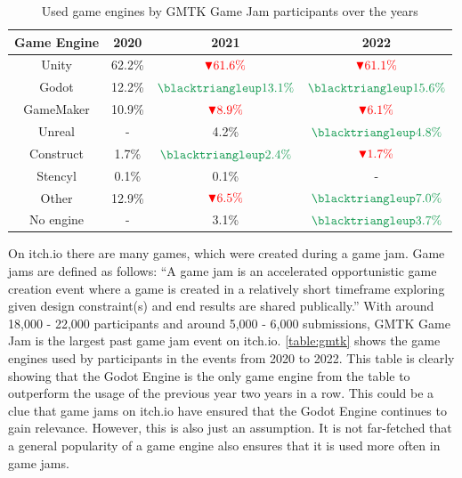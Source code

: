 \begin{table}[h!]
    \centering
    \begin{tabular}{|c c c c|}
        \hline
        Game Engine & 2020   & 2021                                               & 2022                                               \\
        \hline\hline
        Unity       & 62.2\% & $\textcolor{red}{\blacktriangledown 61.6\%}$       & $\textcolor{red}{\blacktriangledown 61.1\%}$       \\
        Godot       & 12.2\% & $\textcolor{ForestGreen}{\blacktriangleup 13.1\%}$ & $\textcolor{ForestGreen}{\blacktriangleup 15.6\%}$ \\
        GameMaker   & 10.9\% & $\textcolor{red}{\blacktriangledown 8.9\% }$       & $\textcolor{red}{\blacktriangledown 6.1\%}$        \\
        Unreal      & -      & 4.2\%                                              & $\textcolor{ForestGreen}{\blacktriangleup 4.8\%}$  \\
        Construct   & 1.7\%  & $\textcolor{ForestGreen}{\blacktriangleup 2.4\%}$  & $\textcolor{red}{\blacktriangledown 1.7\%}$        \\
        Stencyl     & 0.1\%  & 0.1\%                                              & -                                                  \\
        Other       & 12.9\% & $\textcolor{red}{\blacktriangledown 6.5\%}$        & $\textcolor{ForestGreen}{\blacktriangleup 7.0\%}$  \\
        No engine   & -      & 3.1\%                                              & $\textcolor{ForestGreen}{\blacktriangleup 3.7\%}$  \\
        \hline
    \end{tabular}
    \caption{Used game engines by GMTK Game Jam participants over the years\cite{gmtk-twitter}}
    \label{table:gmtk}
\end{table}

On itch.io there are many games, which were created during a game jam.
Game jams are defined as follows:
``A game jam is an accelerated opportunistic game creation event where a game is created in a relatively short timeframe exploring given design constraint(s) and end results are shared publically\cite{game-jam-definition}.''
With around 18,000 - 22,000 participants and around 5,000 - 6,000 submissions, GMTK Game Jam is the largest past game jam event on itch.io\cite{itch-past-jams}.
\autoref{table:gmtk} shows the game engines used by participants in the events from 2020 to 2022.
This table is clearly showing that the Godot Engine is the only game engine from the table to outperform the usage of the previous year two years in a row.
This could be a clue that game jams on itch.io have ensured that the Godot Engine continues to gain relevance.
However, this is also just an assumption.
It is not far-fetched that a general popularity of a game engine also ensures that it is used more often in game jams.\\

